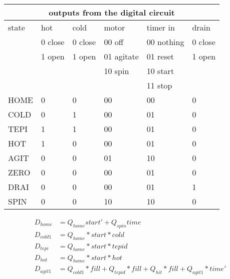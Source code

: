 \begin{enumerate}
\begin{onlysolution}
{                \begin{tabular}{|l|||l|l|l|l|l|} \hline
                    \multicolumn{6}{|c|}{outputs from the digital circuit}        \\ \hline \hline
                    state & hot     & cold    & motor      & timer in   & drain   \\ \hline
                    & 0 close & 0 close & 00 off     & 00 nothing & 0 close \\ \hline
                    & 1 open  & 1 open  & 01 agitate & 01 reset   & 1 open  \\ \hline
                    &         &         & 10 spin    & 10 start   &         \\ \hline
                    &         &         &            & 11 stop    &         \\ \hline \hline
                    HOME  &    0    & 0       & 00         & 00         & 0       \\ \hline
                    COLD  &    0    & 1       & 00         & 01         & 0       \\ \hline
                    TEPI  &    1    & 1       & 00         & 01         & 0       \\ \hline
                    HOT   &    1    & 0       & 00         & 01         & 0       \\ \hline
                    AGIT  &    0    & 0       & 01         & 10         & 0       \\ \hline
                    ZERO  &    0    & 0       & 00         & 01         & 0       \\ \hline
                    DRAI  &    0    & 0       & 00         & 01         & 1       \\ \hline
                    SPIN  &    0    & 0       & 10         & 10         & 0       \\ \hline
                \end{tabular}
                \begin{align*}
                    D_{home}   &= Q_{home}start' + Q_{spin}time \\
                    D_{cold1}  &= Q_{home}*start*cold \\
                    D_{tepi}   &= Q_{home}*start*tepid \\
                    D_{hot}    &= Q_{home}*start*hot \\
                    D_{agit1}  &= Q_{cold1}*fill + Q_{tepid}*fill + Q_{hit}*fill + Q_{agit1}*time' \\

\end{align*}}
\end{onlysolution}
\end{enumerate}

